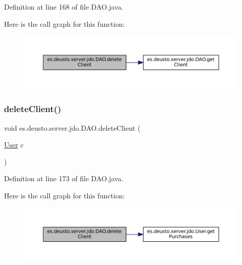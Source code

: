 Definition at line 168 of file D\+A\+O.\+java.

Here is the call graph for this function\+:
\nopagebreak
\begin{figure}[H]
\begin{center}
\leavevmode
\includegraphics[width=350pt]{classes_1_1deusto_1_1server_1_1jdo_1_1_d_a_o_a9664ce68819a53c7b27add7f305a52b0_cgraph}
\end{center}
\end{figure}
\mbox{\label{classes_1_1deusto_1_1server_1_1jdo_1_1_d_a_o_aa914bb9b49e39cfa9a1254ce578aaae1}} 
\subsubsection{\texorpdfstring{deleteClient()}{deleteClient()}\hspace{0.1cm}{\footnotesize\ttfamily [2/2]}}
{\footnotesize\ttfamily void es.\+deusto.\+server.\+jdo.\+D\+A\+O.\+delete\+Client (\begin{DoxyParamCaption}\item[{\mbox{\hyperlink{classes_1_1deusto_1_1server_1_1jdo_1_1_user}{User}}}]{c }\end{DoxyParamCaption})}



Definition at line 173 of file D\+A\+O.\+java.

Here is the call graph for this function\+:
\nopagebreak
\begin{figure}[H]
\begin{center}
\leavevmode
\includegraphics[width=350pt]{classes_1_1deusto_1_1server_1_1jdo_1_1_d_a_o_aa914bb9b49e39cfa9a1254ce578aaae1_cgraph}
\end{center}
\end{figure}
\mbox{\label{classes_1_1deusto_1_1server_1_1jdo_1_1_d_a_o_a9bcf552682ef562673a7c725d003debf}} 
